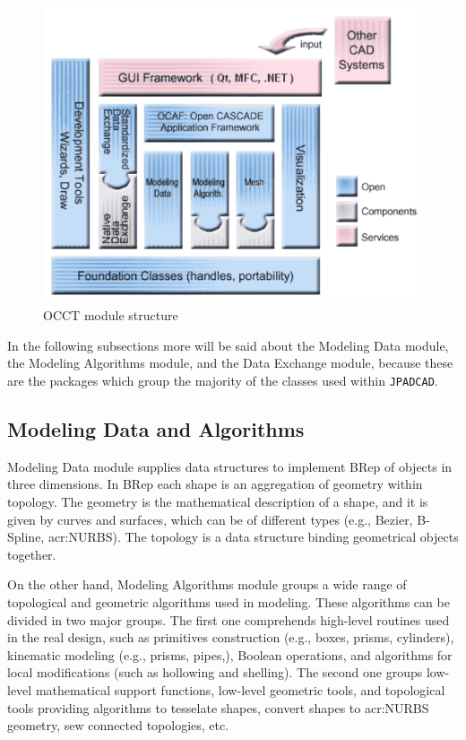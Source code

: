 %
\begin{figure}[H]
\centering
\includegraphics[scale=2.0]{Immagini/Capitolo2/OCCTStructure}
\caption{OCCT module structure}
\label{fig:OCCTStructure}
\end{figure}
%
\noindent
In the following subsections more will be said about the Modeling Data module, the Modeling Algorithms module, and the Data Exchange module, because these are the packages which group the majority of the classes used within \lstinline[language=Java]!JPADCAD!.

\subsection{Modeling Data and Algorithms}
\label{sec2.2.1}

Modeling Data module supplies data structures to implement \gls{BRep} of objects in three dimensions. In \gls{BRep} each shape is an aggregation of geometry within topology. The geometry is the mathematical description of a shape, and it is given by curves and surfaces, which can be of different types (e.g., Bezier, B-Spline, \gls{acr:NURBS}). The topology is a data structure binding geometrical objects together. 

\bigskip
\noindent
On the other hand, Modeling Algorithms module groups a wide range of topological and geometric algorithms used in modeling. These algorithms can be divided in two major groups. The first one comprehends high-level routines used in the real design, such as primitives construction (e.g., boxes, prisms, cylinders), kinematic modeling (e.g., prisms, pipes,), Boolean operations, and algorithms for local modifications (such as hollowing and shelling). The second one groups low-level mathematical support functions, low-level geometric tools, and topological tools providing algorithms to tesselate shapes, convert shapes to \gls{acr:NURBS} geometry, sew connected topologies, etc.

